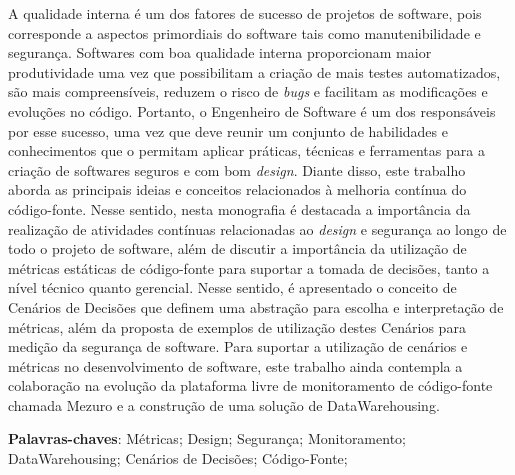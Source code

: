 \begin{resumo}

A qualidade interna é um dos fatores de sucesso de projetos de software, pois corresponde a aspectos primordiais do software tais como manutenibilidade e segurança. Softwares com boa qualidade interna proporcionam maior produtividade uma vez que possibilitam a criação de mais testes automatizados, são mais compreensíveis, reduzem o risco de \emph{bugs} e facilitam as modificações e evoluções no código. Portanto, o Engenheiro de Software é um dos responsáveis por esse sucesso, uma vez que deve reunir um conjunto de habilidades e conhecimentos que o permitam aplicar práticas, técnicas e ferramentas para a criação de softwares seguros e com bom \emph{design}. Diante disso, este trabalho aborda as principais ideias e conceitos relacionados à melhoria contínua do código-fonte. Nesse sentido, nesta monografia é destacada a importância da realização de atividades contínuas relacionadas ao \emph{design} e segurança ao longo de todo o projeto de software, além de discutir a importância da utilização de métricas estáticas de código-fonte para suportar a tomada de decisões, tanto a nível técnico quanto gerencial. Nesse sentido, é apresentado o conceito de Cenários de Decisões que definem uma abstração para escolha e interpretação de métricas, além da proposta de exemplos de utilização destes Cenários para medição da segurança de software. Para suportar a utilização de cenários e métricas no desenvolvimento de software, este trabalho ainda contempla a colaboração na evolução da plataforma livre de monitoramento de código-fonte chamada Mezuro e a construção de uma solução de DataWarehousing.

 \vspace{\onelineskip}
    
 \noindent
 \textbf{Palavras-chaves}: Métricas; Design; Segurança; Monitoramento; DataWarehousing; Cenários de Decisões; Código-Fonte;
\end{resumo}
